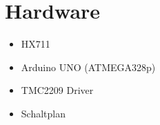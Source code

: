 \section{Hardware}
\label{sec:Hardware}



\begin{itemize}
    \item HX711
    \item Arduino UNO (ATMEGA328p)
    \item TMC2209 Driver
    \item Schaltplan
\end{itemize}


